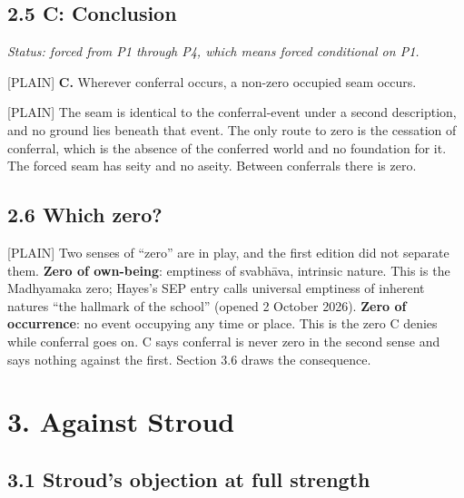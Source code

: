 \documentclass[11pt]{article}
\newcommand{\register}[1]{{\ttfamily\small #1}}
\begin{document}
\subsection*{2.5 C: Conclusion}

\emph{Status: forced from P1 through P4, which means forced conditional on P1.}

\register{[PLAIN]} \textbf{C.} Wherever conferral occurs, a non-zero occupied seam occurs.

\register{[PLAIN]} The seam is identical to the conferral-event under a second description, and no ground lies beneath that event. The only route to zero is the cessation of conferral, which is the absence of the conferred world and no foundation for it. The forced seam has seity and no aseity. Between conferrals there is zero.

\subsection*{2.6 Which zero?}

\register{[PLAIN]} Two senses of ``zero'' are in play, and the first edition did not separate them. \textbf{Zero of own-being}: emptiness of svabhāva, intrinsic nature. This is the Madhyamaka zero; Hayes's SEP entry calls universal emptiness of inherent natures ``the hallmark of the school'' (opened 2 October 2026). \textbf{Zero of occurrence}: no event occupying any time or place. This is the zero C denies while conferral goes on. C says conferral is never zero in the second sense and says nothing against the first. Section 3.6 draws the consequence.

\section*{3. Against Stroud}

\subsection*{3.1 Stroud's objection at full strength}
\end{document}
